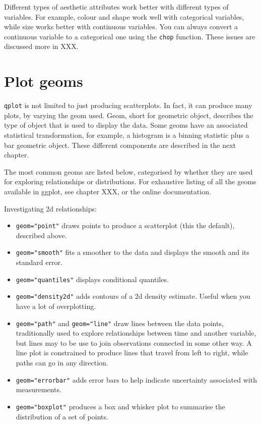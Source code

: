 Different types of aesthetic attributes work better with different types of variables.  For example, colour and shape work well with categorical variables, while size works better with continuous variables.  You can always convert a continuous variable to a categorical one using the {\tt chop} function.  These issues are discussed more in XXX.

\section{Plot geoms}\label{sec:plot_geoms}

{\tt qplot} is not limited to just producing scatterplots.  In fact, it can produce many plots, by varying the geom used. Geom, short for geometric object, describes the type of object that is used to display the data.  Some geoms have an associated statistical transformation, for example, a histogram is a binning statistic plus a bar geometric object.  These different components are described in the next chapter.

The most common geoms are listed below, categorised by whether they are used for exploring relationships or distributions.  For exhaustive listing of all the geoms available in ggplot, see chapter XXX, or the online documentation.  

Investigating 2d relationships:

\begin{itemize}
	\item {\tt geom="point"} draws points to produce a scatterplot (this the default), described above.
	\item {\tt geom="smooth"} fits a smoother to the data and displays the smooth and its standard error.
	\item {\tt geom="quantiles"} displays conditional quantiles.
	\item {\tt geom="density2d"} adds contours of a 2d density estimate.  Useful when you have a lot of overplotting.
	\item {\tt geom="path"} and {\tt geom="line"} draw lines between the data points, traditionally used to explore relationships between time and another variable, but lines may to be use to join observations connected in some other way.  A line plot is constrained to produce lines that travel from left to right, while paths can go in any direction.
	\item {\tt geom="errorbar"} adds error bars to help indicate uncertainty associated with measurements.
	\item {\tt geom="boxplot"} produces a box and whisker plot to summarise the distribution of a set of points.
\end{itemize}

